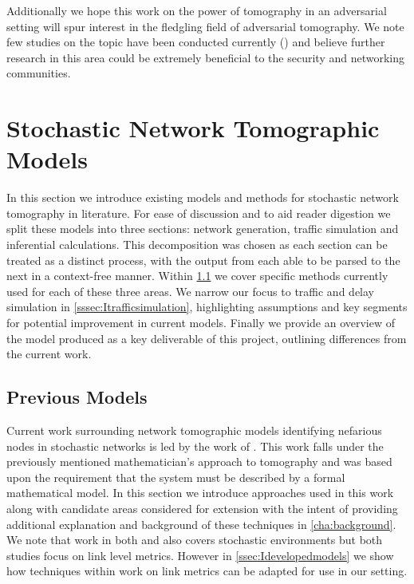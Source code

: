 Additionally we hope this work on the power of tomography in an adversarial setting will spur interest in the fledgling field of adversarial tomography. We note few studies on the topic have been conducted currently (\cite{he_network_2021}) and believe further research in this area could be extremely beneficial to the security and networking communities.
\section{Stochastic Network Tomographic Models}
\label{sec:Imodels}

In this section we introduce existing models and methods for stochastic network tomography in literature. For ease of discussion and to aid reader digestion we split these models into three sections: network generation, traffic simulation and inferential calculations. This decomposition was chosen as each section can be treated as a distinct process, with the output from each able to be parsed to the next in a context-free manner. Within \cref{ssec:Icurrentmodels} we cover specific methods currently used for each of these three areas. We narrow our focus to traffic and delay simulation in \cref{sssec:Itrafficsimulation}, highlighting assumptions and key segments for potential improvement in current models. Finally we provide an overview of the model produced as a key deliverable of this project, outlining differences from the current work.

\subsection{Previous Models}
\label{ssec:Icurrentmodels}

Current work surrounding network tomographic models identifying nefarious nodes in stochastic networks is led by the work of \cite{barnes_stochastic_2020}. This work falls under the previously mentioned mathematician's approach to tomography and was based upon the requirement that the system must be described by a formal mathematical model. In this section we introduce approaches used in this work along with candidate areas considered for extension with the intent of providing additional explanation and background of these techniques in \cref{cha:background}. We note that work in both \cite{he_fisher_2015} and \cite{kolar_distributed_2020} also covers stochastic environments but both studies focus on link level metrics. However in \cref{ssec:Idevelopedmodels} we show how techniques within work on link metrics can be adapted for use in our setting.

